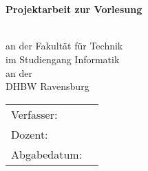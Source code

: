 \begin{titlepage}
	\begin{center}
		\vspace*{2cm}
		\LARGE\bf\myTopic\\
		\Large\rm\mySubTopic\\
		\vspace*{3cm}
		\bf Projektarbeit zur Vorlesung\\
		\myVorlesung\\
		\normalsize\rm
		\vspace*{1cm}

		\vspace*{1cm}
		an der Fakultät für Technik\\
		im Studiengang Informatik\\
		\vspace*{1cm}
		an der\\
		DHBW Ravensburg
		\vfill
	\end{center}
	\begin{tabular}{ll}
		Verfasser:&\myAutor \myMatriculationNumber\\
		Dozent:&\myProf\\
		Abgabedatum:&\myEndDate\\
	\end{tabular}
\end{titlepage}
\newpage
\setcounter{page}{2}
